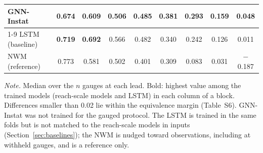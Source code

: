 \begin{table}
\begin{tabular*}{\textwidth}{@{\extracolsep{\fill}}lcccccccc@{}}
GNN-Instat & 0.674 & 0.609 & 0.506 & \textbf{0.485} & 0.381 & 0.293 & 0.159 & \textbf{0.048} \\
\cmidrule{1-9}
LSTM (baseline) & \textbf{0.719} & \textbf{0.692} & 0.566 & 0.482 & 0.340 & 0.242 & 0.126 & 0.011 \\
NWM (reference) & 0.773 & 0.581 & 0.502 & 0.401 & 0.309 & 0.083 & 0.031 & $-$0.187 \\
\bottomrule
\end{tabular*}
\begin{flushleft}
\footnotesize \emph{Note.} Median over the $n$ gauges at each lead. Bold: highest value among the trained models (reach-scale models and LSTM) in each column of a block. Differences smaller than 0.02 lie within the equivalence margin (Table~S6). GNN-Instat was not trained for the gauged protocol. The LSTM is trained in the same folds but is not matched to the reach-scale models in inputs (Section~\ref{sec:baselines}); the NWM is nudged toward observations, including at withheld gauges, and is a reference only.
\end{flushleft}
\end{table}
